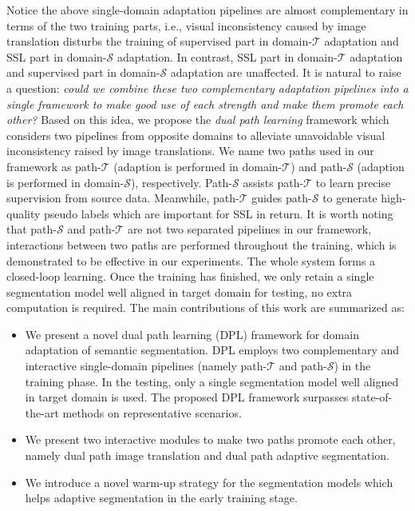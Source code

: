\documentclass[10pt,twocolumn,letterpaper]{article}
\begin{document}
Notice the above single-domain adaptation pipelines are almost complementary in terms of the two training parts, i.e., visual inconsistency caused by image translation disturbs the training of supervised part in domain-$\mathcal{T}$ adaptation and SSL part in domain-$\mathcal{S}$ adaptation. In contrast, SSL part in domain-$\mathcal{T}$ adaptation and supervised part in domain-$\mathcal{S}$ adaptation are unaffected. It is natural to raise a question: \emph{could we combine these two complementary adaptation pipelines into a single framework to make good use of each strength and make them promote each other?} Based on this idea, we propose the \emph{dual path learning} framework which considers two pipelines from opposite domains to alleviate unavoidable visual inconsistency raised by image translations. We name two paths used in our framework as path-$\mathcal{T}$ (adaption is performed in domain-$\mathcal{T}$) and path-$\mathcal{S}$ (adaption is performed in domain-$\mathcal{S}$), respectively. Path-$\mathcal{S}$ assists path-$\mathcal{T}$ to learn precise supervision from source data. Meanwhile, path-$\mathcal{T}$ guides path-$\mathcal{S}$ to generate high-quality pseudo labels which are important for SSL in return. It is worth noting that path-$\mathcal{S}$ and path-$\mathcal{T}$ are not two separated pipelines in our framework, interactions between two paths are performed throughout the training, which is demonstrated to be effective in our experiments. The whole system forms a closed-loop learning. Once the training has finished, we only retain a single segmentation model well aligned in target domain for testing, no extra computation is required. The main contributions of this work are summarized as:
\begin{itemize}
\item We present a novel dual path learning (DPL) framework for domain adaptation of semantic segmentation. DPL employs two complementary and interactive single-domain pipelines (namely path-$\mathcal{T}$ and path-$\mathcal{S}$) in the training phase. In the testing, only a single segmentation model well aligned in target domain is used. The proposed DPL framework surpasses state-of-the-art methods on representative scenarios.
\item We present two interactive modules to make two paths promote each other, namely dual path image translation and dual path adaptive segmentation.
\item We introduce a novel warm-up strategy for the segmentation models which helps adaptive segmentation in the early training stage.
\end{itemize}
\end{document}
